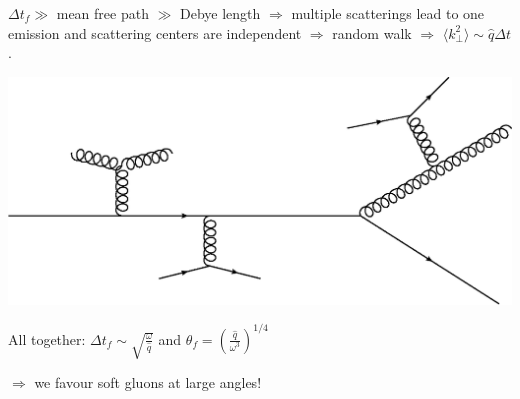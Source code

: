 \documentclass[pstricks,mathserif]{beamer}
\begin{document}
\begin{frame}



$\Delta t_f \gg $ mean free path $\gg$ Debye length $\Rightarrow$  multiple scatterings lead to one emission and scattering centers are independent  $\Rightarrow$ random walk $\Rightarrow$ $\langle k_\perp^2 \rangle \sim \hat{q}\Delta t$.

\begin{center}
\includegraphics[width=0.5\linewidth]{scattering.eps}
\end{center}



All together: $\Delta t_f \sim \sqrt{\frac{\omega}{\hat{q}}}$ 
and $\theta_f=\left( \frac{\hat{q}}{\omega^3} \right)^{1/4}$

$\Rightarrow$ we favour soft gluons at large angles!

\end{frame}
\end{document}
